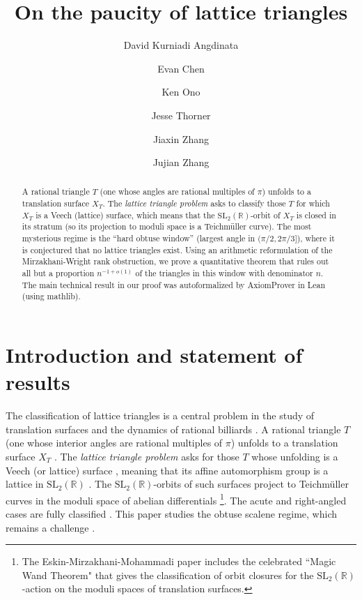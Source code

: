 \documentclass[12pt]{amsart}
\title{On the paucity of lattice triangles}
\author[D.~K. Angdinata]{David Kurniadi Angdinata}
\author[E. Chen]{Evan Chen}
\author[K. Ono]{Ken Ono}
\author[J. Thorner]{Jesse Thorner}
\author[Jiaxin Zhang]{Jiaxin Zhang}
\author[Jujian Zhang]{Jujian Zhang}
\theoremstyle{definition}
\newcommand{\R}{\mathbb{R}}
\newcommand{\SL}{\mathrm{SL}}
\begin{document}
\begin{abstract}
A rational triangle $T$ (one whose angles are rational multiples of $\pi$) unfolds to a translation surface ${X_T}$.  The \emph{lattice triangle problem} asks to classify those $T$ for which ${X_T}$ is a Veech (lattice) surface, which means that the $\SL_2(\R)$-orbit of ${X_T}$ is closed in its stratum (so its projection to moduli space is a Teichm\"uller curve). The most mysterious regime is the ``hard obtuse window'' (largest angle in $(\pi/2,2\pi/3]$), where it is conjectured that no lattice triangles exist. Using an arithmetic reformulation of the Mirzakhani-Wright rank obstruction, we prove a quantitative theorem that rules out all but a proportion $n^{-1+o(1)}$ of the triangles in this window with denominator $n$.  The main technical result in our proof was autoformalized by AxiomProver in Lean (using mathlib).
\end{abstract}

\maketitle

\section{Introduction and statement of results}\label{sec:Intro1}

The classification of lattice triangles is a central problem in the study of translation surfaces and the dynamics of rational billiards \cite{GJ, Hub, Vo}. A rational triangle $T$ (one whose interior angles are rational multiples of $\pi$) unfolds to a translation surface ${X_T}$ \cite{GJ, Wa}.  The \emph{lattice triangle problem} asks for those $T$ whose unfolding is a Veech (or lattice) surface \cite{Veech1, Veech2}, meaning that its affine automorphism group is a lattice in $\SL_2(\R)$ \cite{Hub, Veech1, Veech2}.  The $\SL_2(\R)$-orbits of such surfaces project to Teichm\"uller curves in the moduli space of abelian differentials \cite{E, EMM, McM, MW}\footnote{The Eskin-Mirzakhani-Mohammadi paper \cite{EMM} includes the celebrated ``Magic Wand Theorem" that gives the classification of orbit closures for the $\SL_2(\R)$-action on the moduli spaces of translation surfaces.}.  The acute and right-angled cases are fully classified \cite{KS00, SP11}.  This paper studies the obtuse scalene regime, which remains a challenge \cite{LNZ, MW}.
\end{document}
